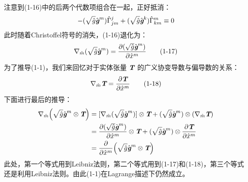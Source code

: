 \documentclass[UTF8]{ctexart}
\begin{document}
注意到(1-16)中的后两个代数项组合在一起，正好抵消：
\begin{equation*}
    -(\sqrt{\hat{g}}\hat{\textit{\textbf{g}}}^m)\hat{\Gamma }_{jm}^j+ (\sqrt{\hat{g}}\hat{\textit{\textbf{g}}}^k)\hat{\Gamma }_{km}^m \equiv 0
\end{equation*}
此时随着Christoffel符号的消失，(1-16)退化为：
\begin{equation*}
     \nabla_{\hat{m}}(\sqrt{\hat{g}}\hat{\textit{\textbf{g}}}^m)=\frac{\partial (\sqrt{\hat{g}}\hat{\textit{\textbf{g}}}^m)}{\partial \hat{x}^m}\tag{1-17}
\end{equation*}
为了推导(1-1)，我们来回忆对于实体张量 $\textit{\textbf{T}} $ 的广义协变导数与偏导数的关系：
\begin{equation*}
    \nabla_{\hat{m}}\textit{\textbf{T}} = \frac{\partial\textit{\textbf{T}} }{\partial \hat{x}^m}\tag{1-18}
\end{equation*}
下面进行最后的推导：
\begin{align*}
    \nabla_{\hat{m}} \Big(\sqrt{\hat{g}}\hat{\textit{\textbf{g}}}^m\otimes \textit{\textbf{T}} \Big) &=[ \nabla_{\hat{m}} (\sqrt{\hat{g}}\hat{\textit{\textbf{g}}}^m)] \otimes \textit{\textbf{T}} + (\sqrt{\hat{g}}\hat{\textit{\textbf{g}}}^m) \otimes (\nabla_{\hat{m}} \textit{\textbf{T}})\\
    &=\frac{\partial (\sqrt{\hat{g}}\hat{\textit{\textbf{g}}}^m)}{\partial \hat{x}^m} \otimes \textit{\textbf{T}} + (\sqrt{\hat{g}}\hat{\textit{\textbf{g}}}^m) \otimes \frac{\partial\textit{\textbf{T}} }{\partial \hat{x}^m}\\
    &=\frac{\partial}{\partial \hat{x}^m}\Big(\sqrt{\hat{g}}\hat{\textit{\textbf{g}}}^m\otimes \textit{\textbf{T}} \Big) 
\end{align*}
此处，第一个等式用到Leibniz法则，第二个等式用到(1-17)和(1-18)，第三个等式还是利用Leibniz法则。由此(1-1)在Lagrange描述下仍然成立。\par
\end{document}

